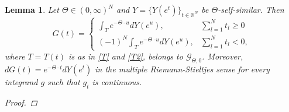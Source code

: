 \documentclass[english, a4paper, 12pt,reqno]{amsart}
\newcommand\myworries[1]{\textcolor{red}{#1}}
\newtheorem{lemma}[defi]{Lemma}
\begin{document}
\begin{lemma}
\label{lemma:G}
Let $\Theta\in (0,\infty)^N$ and $Y = \{Y(e^t)\}_{t\in\mathbb{R}^N}$ be $\Theta$-self-similar. Then 
\begin{equation}
\label{eq:G}
G(t) = \begin{cases} 
      \int_T e^{-\Theta\cdot u} dY(e^u), & \sum_{l=1}^N t_l \geq 0 \\
      (-1)^N\int_T e^{-\Theta\cdot u} dY(e^u), & \sum_{l=1}^N t_l < 0, 
   \end{cases}
\end{equation}
where $T=T(t)$ is as in \eqref{T} and \eqref{T2}, belongs to $\mathcal{G}_{\Theta,0}$. Moreover, $dG(t) = e^{-\Theta\cdot t} d Y(e^t)$ in the multiple Riemann-Stieltjes sense for every integrand $g$ such that $g_t$ is continuous.
\begin{proof}

\end{proof}
\end{lemma}
\end{document}
